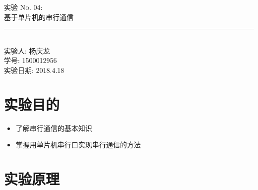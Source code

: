 
\newcommand{\labno}{04}
\newcommand{\labtitle}{基于单片机的串行通信}
\newcommand{\authorname}{杨庆龙}
\newcommand{\idnumber}{1500012956}
\newcommand{\labdate}{2018.4.18}



\begin{CJK}

\begin{titlepage}
\begin{center}
{\LARGE \textsc{实验 No. \labno:} \\ \vspace{4pt}}
{\Large \textsc{\labtitle} \\ \vspace{4pt}}
\rule[13pt]{\textwidth}{1pt} \\ \vspace{150pt}
{\large 实验人: \authorname \\ \vspace{10pt}
学号: \idnumber \\ \vspace{10pt}
实验日期: \labdate}
\end{center}
\end{titlepage}
\section{实验目的}
\begin{itemize}
  \item 了解串行通信的基本知识
  \item 掌握用单片机串行口实现串行通信的方法
\end{itemize}
\section{实验原理}

\end{CJK}

